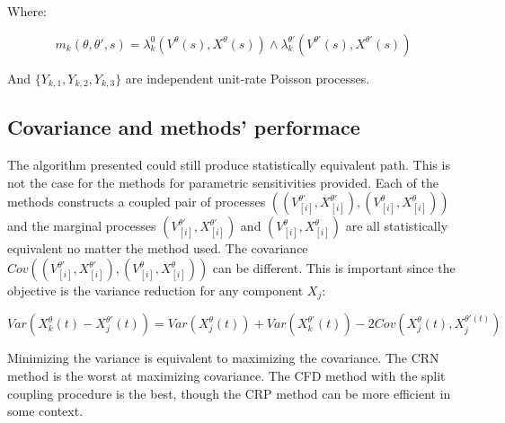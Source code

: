 	Where:

	$$m_k(\theta, \theta', s) = \lambda_k^0(V^\theta(s), X^\theta(s))\land\lambda_k^{\theta'}(V^{\theta'}(s), X^{\theta'}(s))$$

	And $\{Y_{k, 1}, Y_{k, 2}, Y_{k, 3}\}$ are independent unit-rate Poisson processes.

	\subsection{Covariance and methods' performace}
	The algorithm presented could still produce statistically equivalent path.
	This is not the case for the methods for parametric sensitivities provided.
	Each of the methods constructs a coupled pair of processes $((V_{[i]}^{\theta'}, X_{[i]}^{\theta'}),(V_{[i]}^\theta, X_{[i]}^{\theta}))$  and the marginal processes $(V_{[i]}^{\theta'}, X_{[i]}^{\theta'})$ and $(V_{[i]}^\theta, X_{[i]}^{\theta})$ are all statistically equivalent no matter the method used.
	The covariance $Cov((V_{[i]}^{\theta'}, X_{[i]}^{\theta'}),(V_{[i]}^\theta, X_{[i]}^{\theta}))$  can be different.
	This is important since the objective is the variance reduction for any component $X_j$:

	$$Var(X_k^\theta(t)-X_j^{\theta'}(t)) = Var(X_j^\theta(t))+Var(X_k^{\theta'}(t))-2Cov(X_j^\theta(t), X_j^{\theta'(t)})$$

	Minimizing the variance is equivalent to maximizing the covariance.
	The CRN method is the worst at maximizing covariance.
	The CFD method with the split coupling procedure is the best, though the CRP method can be more efficient in some context.

